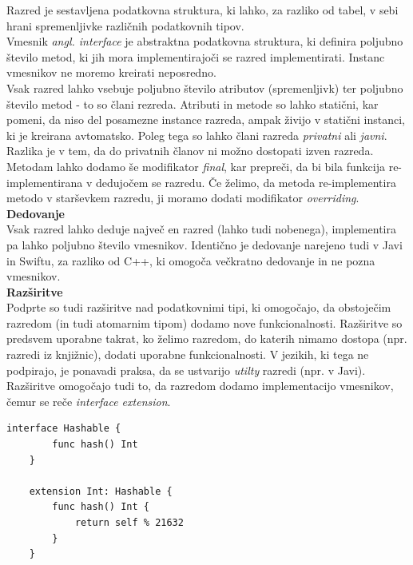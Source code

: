 \documentclass[a4paper, 12pt]{book}
\begin{document}
Razred je sestavljena podatkovna struktura, ki lahko, za razliko od tabel, v sebi hrani spremenljivke različnih podatkovnih tipov. \\
\indent Vmesnik \textit{angl. interface} je abstraktna podatkovna struktura, ki definira poljubno število metod, ki jih mora implementirajoči se razred implementirati. Instanc vmesnikov ne moremo kreirati neposredno.\\
\indent Vsak razred lahko vsebuje poljubno število atributov (spremenljivk) ter poljubno število metod - to so člani rezreda. Atributi in metode so lahko statični, kar pomeni, da niso del posamezne instance razreda, ampak živijo v statični instanci, ki je kreirana avtomatsko. Poleg tega so lahko člani razreda \textit{privatni} ali \textit{javni}. Razlika je v tem, da do privatnih članov ni možno dostopati izven razreda. Metodam lahko dodamo še modifikator \textit{final}, kar prepreči, da bi bila funkcija re-implementirana v dedujočem se razredu. Če želimo, da metoda re-implementira metodo v starševkem razredu, ji moramo dodati modifikator \textit{overriding}. \\

\indent  \textbf{Dedovanje} \\
\noindent Vsak razred lahko deduje največ en razred (lahko tudi nobenega), implementira pa lahko poljubno število vmesnikov. Identično je dedovanje narejeno tudi v Javi in Swiftu, za razliko od C++, ki omogoča večkratno dedovanje in ne pozna vmesnikov. \\

\indent  \textbf{Razširitve} \\
\noindent Podprte so tudi razširitve nad podatkovnimi tipi, ki omogočajo, da obstoječim razredom (in tudi atomarnim tipom) dodamo nove funkcionalnosti. Razširitve so predsvem uporabne takrat, ko želimo razredom, do katerih nimamo dostopa (npr. razredi iz knjižnic), dodati uporabne funkcionalnosti. V jezikih, ki tega ne podpirajo, je ponavadi praksa, da se ustvarijo \textit{utilty} razredi (npr. v Javi). \\
\indent Razširitve omogočajo tudi to, da razredom dodamo implementacijo vmesnikov, čemur se reče \textit{interface extension}. \\

\begin{lstlisting}[caption=Primer razširitve tipa Int z vmesnikom Hashable, captionpos=b]
	interface Hashable {
	    func hash() Int
	}

	extension Int: Hashable {
	    func hash() Int {
	        return self % 21632
	    }
	}
\end{lstlisting}
\end{document}
